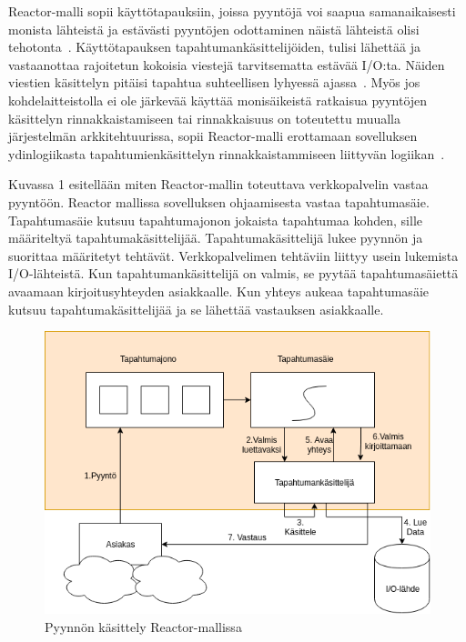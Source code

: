 \documentclass[finnish]{tktltiki2}
\theoremstyle{definition}
\theoremstyle{remark}
\begin{document}
Reactor-malli sopii käyttötapauksiin, joissa pyyntöjä voi saapua
samanaikaisesti monista lähteistä ja estävästi
pyyntöjen odottaminen näistä lähteistä olisi tehotonta~\cite{schmidt_reactor:_1995}.
Käyttötapauksen tapahtumankäsittelijöiden, tulisi
lähettää ja vastaanottaa rajoitetun kokoisia viestejä
tarvitsematta estävää I/O:ta. Näiden viestien käsittelyn
pitäisi tapahtua suhteellisen lyhyessä ajassa~\cite{schmidt_reactor:_1995}.
Myös jos kohdelaitteistolla ei ole järkevää käyttää monisäikeistä
ratkaisua pyyntöjen käsittelyn rinnakkaistamiseen tai rinnakkaisuus
on toteutettu muualla järjestelmän arkkitehtuurissa, sopii Reactor-malli
erottamaan sovelluksen ydinlogiikasta tapahtumienkäsittelyn
rinnakkaistammiseen liittyvän logiikan~\cite{schmidt_reactor:_1995}.



Kuvassa 1 esitellään miten Reactor-mallin toteuttava verkkopalvelin
vastaa pyyntöön.
Reactor mallissa sovelluksen ohjaamisesta vastaa tapahtumasäie.
Tapahtumasäie kutsuu tapahtumajonon jokaista tapahtumaa kohden, sille
määriteltyä tapahtumakäsittelijää. Tapahtumakäsittelijä
lukee pyynnön ja suorittaa määritetyt tehtävät. Verkkopalvelimen
tehtäviin liittyy usein lukemista I/O-lähteistä.
Kun tapahtumankäsittelijä on valmis, se pyytää tapahtumasäiettä
avaamaan kirjoitusyhteyden asiakkaalle. Kun yhteys aukeaa
tapahtumasäie kutsuu tapahtumakäsittelijää ja se lähettää vastauksen
asiakkaalle.
\begin{figure}
    \centering
    \caption{Pyynnön käsittely Reactor-mallissa}
    \includegraphics[scale=0.5]{reactor.png}
\end{figure}
\end{document}
